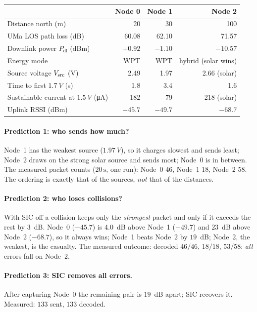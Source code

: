 \begin{center}
\small
\renewcommand{\arraystretch}{1.12}
\begin{tabular}{@{}lrrr@{}}
\toprule
 & Node 0 & Node 1 & Node 2\\
\midrule
Distance north (m) & 20 & 30 & 100\\
UMa LOS path loss (dB) & 60.08 & 62.10 & 71.57\\
Downlink power $P_{\mathrm{dl}}$ (dBm) & $+0.92$ & $-1.10$ & $-10.57$\\
Energy mode & WPT & WPT & hybrid (solar wins)\\
Source voltage $V_{\mathrm{src}}$ (V) & 2.49 & 1.97 & 2.66 (solar)\\
Time to first $\SI{1.7}{V}$ (s) & 1.8 & 3.4 & 1.6\\
Sustainable current at $\SI{1.5}{V}$ (\si{\micro A}) & 182 & 79 & 218 (solar)\\
Uplink RSSI (dBm) & $-45.7$ & $-49.7$ & $-68.7$\\
\bottomrule
\end{tabular}
\end{center}

\paragraph{Prediction 1: who sends how much?}
Node~1 has the weakest source ($\SI{1.97}{V}$), so it charges slowest and sends least; Node~2 draws on the strong solar source and sends most; Node~0 is in between. The measured packet counts ($20\,\mathrm{s}$, one run): Node~0 $46$, Node~1 $18$, Node~2 $58$. The ordering is exactly that of the sources, \emph{not} that of the distances.

\paragraph{Prediction 2: who loses collisions?}
With SIC off a collision keeps only the \emph{strongest} packet and only if it exceeds the rest by $3$~dB. Node~0 ($-45.7$) is $4.0$~dB above Node~1 ($-49.7$) and $23$~dB above Node~2 ($-68.7$), so it always wins; Node~1 beats Node~2 by $19$~dB; Node~2, the weakest, is the casualty. The measured outcome: decoded $46/46$, $18/18$, $53/58$: \emph{all} errors fall on Node~2.

\paragraph{Prediction 3: SIC removes all errors.}
After capturing Node~0 the remaining pair is $19$~dB apart; SIC recovers it. Measured: $133$ sent, $133$ decoded.

